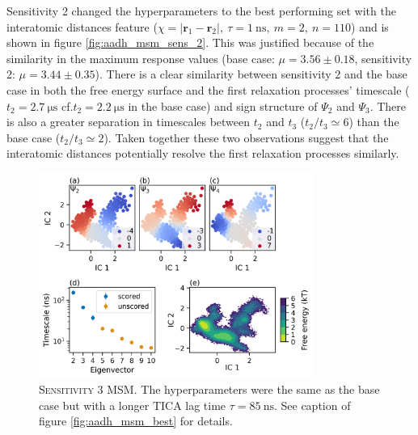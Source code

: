 Sensitivity 2 changed the hyperparameters to the best performing set with the interatomic distances feature ($\chi = |\mathbf{r}_{1} - \mathbf{r}_{2}|,\ \tau = \SI{1}{\nano\second},\ m=2,\ n=110$) and is shown in figure \ref{fig:aadh_msm_sens_2}.  This was justified because of the similarity in the maximum response values (base case: $\mu=3.56 \pm 0.18$, sensitivity 2: $\mu=3.44 \pm 0.35$). There is a clear similarity between sensitivity 2 and the base case in both the free energy surface and the first relaxation processes' timescale ($t_{2} = \SI{2.7}{\micro\second}$ cf.$t_{2} = \SI{2.2}{\micro\second}$ in the base case) and sign structure of $\Psi_{2}$ and $\Psi_{3}$.  There is also a greater separation in timescales between $t_{2}$ and $t_{3}$ ($t_{2}/t_{3} \simeq 6$) than the base case ($t_{2}/t_{3} \simeq 2$). Taken together these two observations suggest that the interatomic distances potentially resolve the first relaxation processes similarly. 

\begin{figure}
    \centering
    \includegraphics[width=0.8\textwidth]{chapters/msm_optimization/figures/aadh_msm_sens_3.png}
    \caption[Sensitivity 3 MSM]{\textsc{Sensitivity 3 MSM}. The hyperparameters were the same as the base case but with a  longer TICA lag time $\tau = \SI{85}{\nano\second}$.  See caption of figure \ref{fig:aadh_msm_best} for details.}
    \label{fig:aadh_msm_sens_3}
\end{figure}

